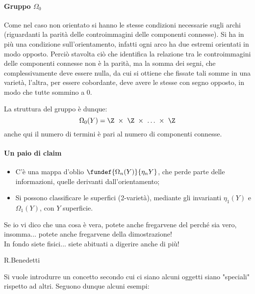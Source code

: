 \paragraph{Gruppo $\Omega_0$}
Come nel caso non orientato si hanno le stesse condizioni necessarie sugli archi (riguardanti la parità delle controimmagini delle componenti connesse). Si ha in più una condizione sull'orientamento, infatti ogni arco ha due estremi orientati in modo opposto.
Perciò stavolta ciò che identifica la relazione tra le controimmagini delle componenti connesse non è la parità, ma la somma dei segni, che complessivamente deve essere nulla, da cui si ottiene che fissate tali somme in una varietà, l'altra, per essere cobordante, deve avere le stesse con segno opposto, in modo che tutte sommino a 0.

La struttura del gruppo è dunque: 
\begin{equation*}
\Omega_0(Y) = \Z~\times~\Z~\times~\dots~\times~\Z
\end{equation*}
anche qui il numero di termini è pari al numero di componenti connesse.


\paragraph{Un paio di claim}
\begin{itemize}
\item C'è una mappa d'oblio $\fundef{\Omega_n(Y)}{\eta_n{Y}}$, che perde parte delle informazioni, quelle derivanti dall'orientamento;
\item Si possono classificare le superfici (2-varietà), mediante gli invarianti $\eta_1(Y)$ e $\Omega_1(Y)$, con $Y$ superficie.
\end{itemize}


\epigraph{Se io vi dico che una cosa è vera, potete anche fregarvene del perché sia vero, insomma... potete anche fregarvene della dimostrazione!\\ In fondo siete fisici... siete abituati a digerire anche di più!}{R.Benedetti}

Si vuole introdurre un concetto secondo cui ci siano alcuni oggetti siano "speciali" rispetto ad altri. Seguono dunque alcuni esempi:

